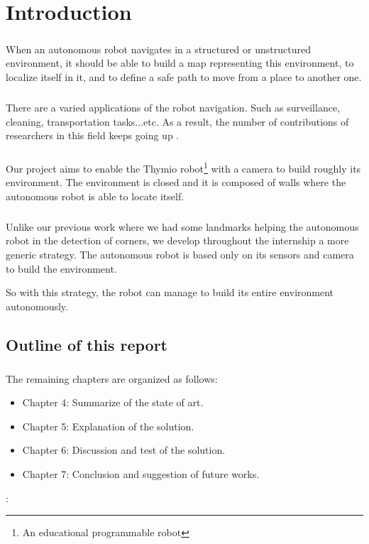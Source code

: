 \documentclass[12pt]{report}
\begin{document}
	\tableofcontents
	\chapter{Introduction}
	\paragraph{}
	When an autonomous robot navigates in a structured or unstructured environment, it should be able to build a map representing this environment, to localize itself in it, and to define a safe path to move from a place to another one.
	
	\paragraph{}
	There are a varied applications of the robot navigation. Such as surveillance, cleaning, transportation tasks...etc. As a result, the number of contributions of researchers in this field keeps going up \cite{bonin-font_visual_2008}.
	
	\paragraph{}
	Our project aims to enable the Thymio robot\footnote{An educational programmable robot} with a camera to build roughly  its environment. The environment is closed and it is composed of walls where the autonomous robot is able to locate itself. 
	
	\paragraph{}
	Unlike our previous work where we had some landmarks helping the autonomous robot in the detection of corners, we develop throughout the internship a more generic strategy. The autonomous robot is based only on its sensors and camera to build the environment.
	
	So with this strategy, the robot can manage to build its entire environment autonomously.
	
	
	\section{Outline of this report}
	\paragraph{}
	The remaining chapters are organized as follows:
	\begin{itemize}
		\item Chapter 4: Summarize of the state of art.
		\item Chapter 5: Explanation of the solution.
		\item Chapter 6: Discussion and test of the solution.
		\item Chapter 7: Conclusion and suggestion of future works.
	\end{itemize}: 
	
\end{document}
